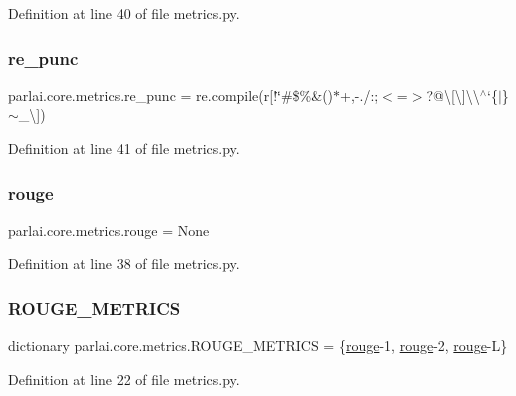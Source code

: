 Definition at line 40 of file metrics.\+py.

\mbox{\label{namespaceparlai_1_1core_1_1metrics_a334cb58cda231eb62dea1fd375f8d687}} 
\subsubsection{\texorpdfstring{re\+\_\+punc}{re\_punc}}
{\footnotesize\ttfamily parlai.\+core.\+metrics.\+re\+\_\+punc = re.\+compile(r\textquotesingle{}\mbox{[}!\char`\"{}\#\$\%\&()$\ast$+,-\/./\+:;$<$=$>$?@\textbackslash{}\mbox{[}\textbackslash{}\mbox{]}\textbackslash{}\textbackslash{}$^\wedge$`\{$\vert$\}$\sim$\+\_\+\textbackslash{}\textquotesingle{}\mbox{]}\textquotesingle{})}



Definition at line 41 of file metrics.\+py.

\mbox{\label{namespaceparlai_1_1core_1_1metrics_ae0fddd2325f5dc52b2a367e52056242a}} 
\subsubsection{\texorpdfstring{rouge}{rouge}}
{\footnotesize\ttfamily parlai.\+core.\+metrics.\+rouge = None}



Definition at line 38 of file metrics.\+py.

\mbox{\label{namespaceparlai_1_1core_1_1metrics_ac01c4a05e91baee81e771e8f7ae9e7e4}} 
\subsubsection{\texorpdfstring{R\+O\+U\+G\+E\+\_\+\+M\+E\+T\+R\+I\+CS}{ROUGE\_METRICS}}
{\footnotesize\ttfamily dictionary parlai.\+core.\+metrics.\+R\+O\+U\+G\+E\+\_\+\+M\+E\+T\+R\+I\+CS = \{\textquotesingle{}\hyperlink{namespaceparlai_1_1core_1_1metrics_ae0fddd2325f5dc52b2a367e52056242a}{rouge}-\/1\textquotesingle{}, \textquotesingle{}\hyperlink{namespaceparlai_1_1core_1_1metrics_ae0fddd2325f5dc52b2a367e52056242a}{rouge}-\/2\textquotesingle{}, \textquotesingle{}\hyperlink{namespaceparlai_1_1core_1_1metrics_ae0fddd2325f5dc52b2a367e52056242a}{rouge}-\/L\textquotesingle{}\}}



Definition at line 22 of file metrics.\+py.


